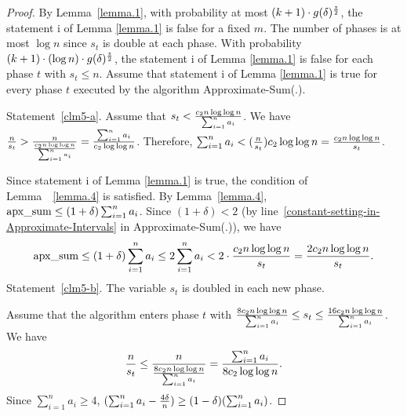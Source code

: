 \documentclass[runningheads]{llncs}
\newcommand{\appsum}{{\rm apx\_sum}}
\begin{document}
\begin{proof}
By Lemma~\ref{lemma.1}, with probability at most $(k+1)\cdot
g(\delta)^{z\over 2}$, the statement i of Lemma \ref{lemma.1} is
false for a fixed $m$. The number of phases is at most $\log n$
since $s_t$ is double at each phase. With probability $(k+1)\cdot
(\log n)\cdot g(\delta)^{z\over 2}$, the statement i of Lemma
\ref{lemma.1} is false for each phase $t$ with $s_t\le n$. Assume
that statement i of Lemma \ref{lemma.1} is true for every phase $t$
executed by the algorithm Approximate-Sum(.).

Statement~\ref{clm5-a}.  Assume that $s_t<{c_2n\log\log n\over
\sum_{i=1}^n a_i}$. We have ${n\over s_t}>{n\over {c_2 n\log\log
n\over \sum_{i=1}^n a_i}}={\sum_{i=1}^n a_i\over c_2\log\log n}$.
Therefore, $\sum_{i=1}^n a_i<({n\over s_t})c_2\log\log
n={c_2n\log\log n\over s_t}$.


Since statement i of Lemma \ref{lemma.1} is true,  the condition of
Lemma~~\ref{lemma.4} is satisfied.  By Lemma~\ref{lemma.4},
$\appsum\le (1+\delta)\sum_{i=1}^n a_i$.
 Since $(1+\delta)<2$ (by line~\ref{constant-setting-in-Approximate-Intervals} in Approximate-Sum(.)), we have
\begin{eqnarray*}
 \appsum\le (1+\delta)\sum_{i=1}^n a_i\le 2\sum_{i=1}^n a_i
 < 2\cdot {c_2n\log\log n\over s_t}= {2c_2n\log\log n\over s_t}.
\end{eqnarray*}
Statement~\ref{clm5-b}. The variable $s_t$ is doubled in each new
phase.

Assume that the algorithm enters phase $t$ with ${8c_2n\log\log
n\over \sum_{i=1}^n a_i}\le s_t\le {16 c_2n\log\log n\over
\sum_{i=1}^n a_i}$.  We have
\begin{eqnarray}
{n\over s_t}\le {n\over {8c_2 n\log\log n\over \sum_{i=1}^n
a_i}}={\sum_{i=1}^n a_i\over 8c_2\log\log n}.\label{n-mt-ineqn}
\end{eqnarray}
 Since
$\sum_{i=1}^na_i\ge 4$, $(\sum_{i=1}^na_i-{4\delta\over n})\ge
(1-\delta)(\sum_{i=1}^na_i)$.



\end{proof}
\end{document}
